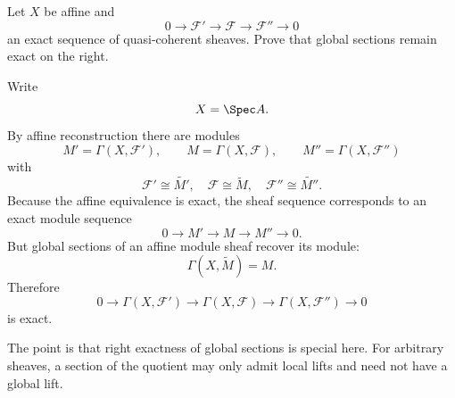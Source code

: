 \begin{problem}\label{prob:vi33-08}
Let \(X\) be affine and
\[
0\to\mathcal F'\to\mathcal F\to\mathcal F''\to0
\]
an exact sequence of quasi-coherent sheaves. Prove that global sections remain exact on the right.
\end{problem}

\ifdefined\FullProblemDossiers
\begin{solution}
Write
\[
X=\Spec A.
\]
By affine reconstruction there are modules
\[
M'=\Gamma(X,\mathcal F'),
\qquad
M=\Gamma(X,\mathcal F),
\qquad
M''=\Gamma(X,\mathcal F'')
\]
with
\[
\mathcal F'\cong\widetilde{M'},
\quad
\mathcal F\cong\widetilde M,
\quad
\mathcal F''\cong\widetilde{M''}.
\]
Because the affine equivalence is exact, the sheaf sequence corresponds to an exact module sequence
\[
0\to M'\to M\to M''\to0.
\]
But global sections of an affine module sheaf recover its module:
\[
\Gamma(X,\widetilde M)=M.
\]
Therefore
\[
\boxed{
0\to\Gamma(X,\mathcal F')
\to\Gamma(X,\mathcal F)
\to\Gamma(X,\mathcal F'')
\to0
}
\]
is exact.

The point is that right exactness of global sections is special here.  For arbitrary sheaves, a section of the
quotient may only admit local lifts and need not have a global lift.
\end{solution}
\fi
